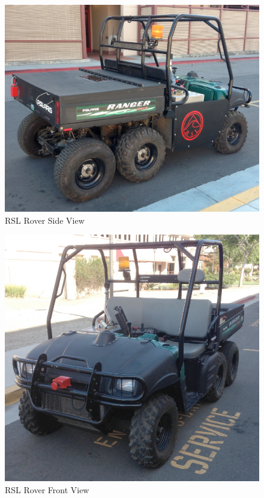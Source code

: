 \begin{figure}[h!]
\begin{center}
\includegraphics[width=.8\textwidth]{Figures/RSLRover_SideVeiw.png}
\caption{RSL Rover Side View}
\label{roverSide}
\end{center}
\end{figure}

\begin{figure}[h!]
\begin{center}
\includegraphics[width=.8\textwidth]{Figures/Rover_Front.png}
\caption{RSL Rover Front View}
\label{roverFront}
\end{center}
\end{figure}

